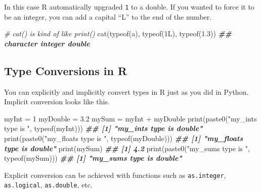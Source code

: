 \documentclass[
  12pt,
  krantz2]{krantz}
\makeatletter
\newenvironment{Shaded}{\begin{snugshade}}{\end{snugshade}}
\newcommand{\CommentTok}[1]{\textcolor[rgb]{0.37,0.37,0.37}{\textit{#1}}}
\newcommand{\DecValTok}[1]{\textcolor[rgb]{0.06,0.06,0.06}{#1}}
\newcommand{\DocumentationTok}[1]{\textcolor[rgb]{0.37,0.37,0.37}{\textbf{\textit{#1}}}}
\newcommand{\FloatTok}[1]{\textcolor[rgb]{0.06,0.06,0.06}{#1}}
\newcommand{\FunctionTok}[1]{\textcolor[rgb]{0,0,0}{#1}}
\newcommand{\NormalTok}[1]{#1}
\newcommand{\OtherTok}[1]{\textcolor[rgb]{0.37,0.37,0.37}{#1}}
\newcommand{\SpecialCharTok}[1]{\textcolor[rgb]{0,0,0}{#1}}
\newcommand{\StringTok}[1]{\textcolor[rgb]{0.5,0.5,0.5}{#1}}
\newenvironment{kframe}{%
\medskip{}
\setlength{\fboxsep}{.8em}
 \def\at@end@of@kframe{}%
 \ifinner\ifhmode%
  \def\at@end@of@kframe{\end{minipage}}%
  \begin{minipage}{\columnwidth}%
 \fi\fi%
 \def\FrameCommand##1{\hskip\@totalleftmargin \hskip-\fboxsep
 \colorbox{shadecolor}{##1}\hskip-\fboxsep
     \hskip-\linewidth \hskip-\@totalleftmargin \hskip\columnwidth}%
 \MakeFramed {\advance\hsize-\width
   \@totalleftmargin\z@ \linewidth\hsize
   \@setminipage}}%
 {\par\unskip\endMakeFramed%
 \at@end@of@kframe}
\renewenvironment{Shaded}{\begin{kframe}}{\end{kframe}}
\makeatother
\begin{document}
In this case R automatically upgraded \texttt{1} to a double. If you wanted to force it to be an integer, you can add a capital ``L'' to the end of the number.

\begin{Shaded}
\begin{Highlighting}[]
\CommentTok{\# cat() is kind of like print()}
\FunctionTok{cat}\NormalTok{(}\FunctionTok{typeof}\NormalTok{(}\StringTok{\textquotesingle{}a\textquotesingle{}}\NormalTok{), }\FunctionTok{typeof}\NormalTok{(1L), }\FunctionTok{typeof}\NormalTok{(}\FloatTok{1.3}\NormalTok{))}
\DocumentationTok{\#\# character integer double}
\end{Highlighting}
\end{Shaded}

\hypertarget{type-conversions-in-r}{%
\subsection{Type Conversions in R}\label{type-conversions-in-r}}

You can explicitly and implicitly convert types in R just as you did in Python. Implicit conversion looks like this.

\begin{Shaded}
\begin{Highlighting}[]
\NormalTok{myInt }\OtherTok{=} \DecValTok{1}
\NormalTok{myDouble }\OtherTok{=} \FloatTok{3.2}
\NormalTok{mySum }\OtherTok{=}\NormalTok{ myInt }\SpecialCharTok{+}\NormalTok{ myDouble}
\FunctionTok{print}\NormalTok{(}\FunctionTok{paste0}\NormalTok{(}\StringTok{"my\_int\textquotesingle{}s type is "}\NormalTok{, }\FunctionTok{typeof}\NormalTok{(myInt)))}
\DocumentationTok{\#\# [1] "my\_int\textquotesingle{}s type is double"}
\FunctionTok{print}\NormalTok{(}\FunctionTok{paste0}\NormalTok{(}\StringTok{"my\_float\textquotesingle{}s type is "}\NormalTok{, }\FunctionTok{typeof}\NormalTok{(myDouble)))}
\DocumentationTok{\#\# [1] "my\_float\textquotesingle{}s type is double"}
\FunctionTok{print}\NormalTok{(mySum)}
\DocumentationTok{\#\# [1] 4.2}
\FunctionTok{print}\NormalTok{(}\FunctionTok{paste0}\NormalTok{(}\StringTok{"my\_sum\textquotesingle{}s type is "}\NormalTok{, }\FunctionTok{typeof}\NormalTok{(mySum)))}
\DocumentationTok{\#\# [1] "my\_sum\textquotesingle{}s type is double"}
\end{Highlighting}
\end{Shaded}

Explicit conversion can be achieved with functions such as \texttt{as.integer}, \texttt{as.logical}, \texttt{as.double}, etc.
\end{document}
